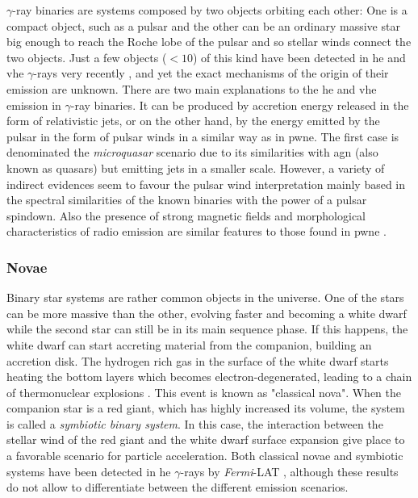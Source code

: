 \documentclass[main.tex]{subfiles}
\begin{document}
$\gamma$-ray binaries are systems composed by two objects orbiting each other: One is a compact object, such as a pulsar and the other can be an ordinary massive star big enough to reach the Roche lobe of the pulsar and so stellar winds connect the two objects. Just a few objects ($< 10$) of this kind have been detected in \gls{he} and \gls{vhe} $\gamma$-rays very recently \cite{2017gammarybinariespop}, and yet the exact mechanisms of the origin of their emission are unknown.
There are two main explanations to the \gls{he} and \gls{vhe} emission in $\gamma$-ray binaries. It can be produced by accretion energy released in the form of relativistic jets, or on the other hand, by the energy emitted by the pulsar in the form of pulsar winds in a similar way as in \gls{pwne}. The first case is denominated the \textit{microquasar} scenario due to its similarities with \gls{agn} (also known as quasars) but emitting jets in a smaller scale. However, a variety of indirect evidences seem to favour the pulsar wind interpretation mainly based in the spectral similarities of the known binaries with the power of a pulsar spindown. Also the presence of strong magnetic fields and morphological characteristics of radio emission are similar features to those found in \gls{pwne} \cite{2013binaries}. 

\subsubsection{Novae}

Binary star systems are rather common objects in the universe. One of the stars can be more massive than the other, evolving faster and becoming a white dwarf while the second star can still be in its main sequence phase. If this happens, the white dwarf can start accreting material from the companion, building an accretion disk. The hydrogen rich gas in the surface of the white dwarf starts heating the bottom layers which becomes electron-degenerated, leading to a chain of thermonuclear explosions \cite{bode_evans_2008}. This event is known as "classical nova".
When the companion star is a red giant, which has highly increased its volume, the system is called a \textit{symbiotic binary system}. In this case, the interaction between the stellar wind of the red giant and the white dwarf surface expansion give place to a favorable scenario for particle acceleration.
 Both classical novae and symbiotic systems have been detected in \gls{he} $\gamma$-rays by \textit{Fermi}-LAT \cite{2010symbioticfermi}, \cite{2014fermiclassicNovae} although these results do not allow to differentiate between the different emission scenarios.\\
 
\end{document}
